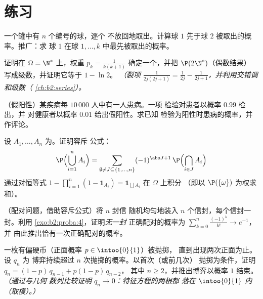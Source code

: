 \section{练习}

\begin{exercise}[$\star$]\label{exo:b2:proba:1}
一个罐中有 $n$ 个编号的球，逐个
不放回地取出。计算球 $1$
先于球 $2$ 被取出的概率。推广：求
球 $1$ 在球 $1, \dots, k$ 中最先被取出的概率。
\end{exercise}

\begin{exercise}[$\star$]\label{exo:b2:proba:2}
证明在 $\Omega = \N^*$ 上，权重 $p_k = \frac{1}{k(k+1)}$
确定一个，并把 $\P(2\N^*)$（偶数结果）
写成级数，并证明它等于 $1 - \ln 2$。
\emph{（裂项 $\frac{1}{2j(2j+1)} = \frac{1}{2j} -
\frac{1}{2j+1}$，并利用交错调和级数（
\cref{ch:b2:series}）。}
\end{exercise}

\begin{exercise}[$\star$]\label{exo:b2:proba:3}
（假阳性）某疾病每 $10\,000$ 人中有一人患病。一项
检验对患者以概率 $0.99$ 检出，并
对健康者以概率 $0.01$ 给出假阳性。求已知
检验为阳性时患病的概率，并作评论。
\end{exercise}

\begin{exercise}[$\star\star$]\label{exo:b2:proba:4}
设 $A_1, \dots, A_n$ 为。证明容斥
公式：
\[
\P\Bigl(\bigcup_{i=1}^n A_i\Bigr)
= \sum_{\emptyset \neq J \subseteq \{1,\dots,n\}}
(-1)^{\abs J + 1}\,\P\Bigl(\bigcap_{i \in J}A_i\Bigr)
\]
通过对恒等式 $1 - \prod_{i=1}^n(1 -
\mathbf{1}_{A_i}) = \mathbf{1}_{\bigcup A_i}$ 在 $\Omega$ 上积分
（即以 $\P(\{\omega\})$ 为权求和）。
\end{exercise}

\begin{exercise}[$\star\star$]\label{exo:b2:proba:5}
（配对问题，借助容斥公式）将 $n$ 封信
随机均匀地装入 $n$ 个信封，每个信封一封。利用
\cref{exo:b2:proba:4}，证明\emph{无一封}
正确配对的概率为 $\sum_{k=0}^n \frac{(-1)^k}{k!} \to e^{-1}$，并
由此推出恰有一次正确配对的概率。
\end{exercise}

\begin{exercise}[$\star\star$]\label{exo:b2:proba:6}
一枚有偏硬币（正面概率 $p \in \intoo{0}{1}$）被抛掷，
直到出现两次正面为止。设 $q_n$ 为
博弈持续超过 $n$ 次抛掷的概率。以首次（或前几次）
抛掷为条件，证明 $q_n = (1-p)\,q_{n-1} + p(1-p)\,q_{n-2}$，
其中 $n \geq 2$，并推出博弈以概率
$1$ 结束。\emph{（通过与几何
数列比较证明 $q_n \to 0$：特征方程的两根都
落在 $\intoo{0}{1}$ 内（取模）。）}
\end{exercise}

